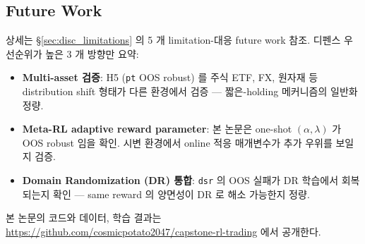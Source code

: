 \documentclass[11pt, a4paper]{article}
\begin{document}
\subsection*{Future Work}

상세는 \S\ref{sec:disc_limitations} 의 5 개 limitation-대응 future work 참조.
디펜스 우선순위가 높은 3 개 방향만 요약:
\begin{itemize}[leftmargin=*]
\item \textbf{Multi-asset 검증}: H5 (\texttt{pt} OOS robust) 를 주식 ETF, FX,
원자재 등 distribution shift 형태가 다른 환경에서 검증 — 짧은-holding 메커니즘의
일반화 정량.
\item \textbf{Meta-RL adaptive reward parameter}: 본 논문은 one-shot
$(\alpha, \lambda)$ 가 OOS robust 임을 확인. 시변 환경에서 online 적응 매개변수가
추가 우위를 보일지 검증.
\item \textbf{Domain Randomization (DR) 통합}: \texttt{dsr} 의 OOS 실패가 DR
학습에서 회복되는지 확인 — same reward 의 양면성이 DR 로 해소 가능한지 정량.
\end{itemize}

본 논문의 코드와 데이터, 학습 결과는
\url{https://github.com/cosmicpotato2047/capstone-rl-trading} 에서 공개한다.



\end{document}
